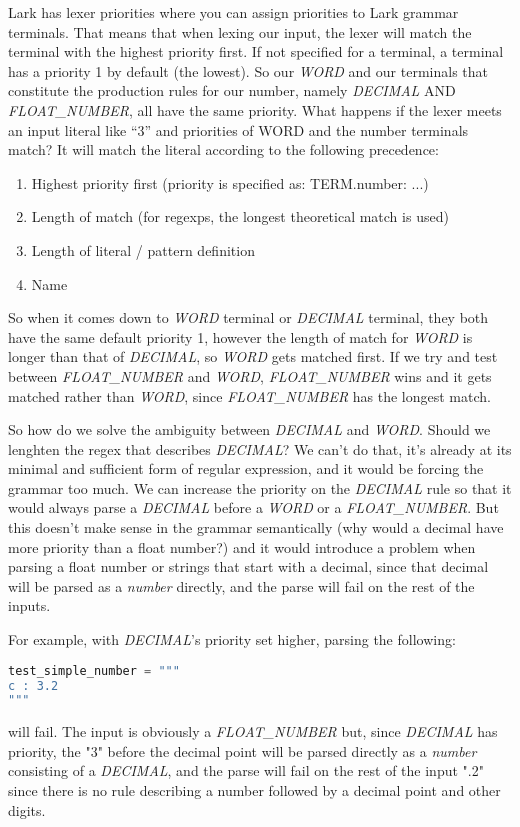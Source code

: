 \documentclass[12pt]{article}
\begin{document}
Lark has lexer priorities where you can assign priorities to Lark grammar terminals. That means that when lexing our input, the lexer will match the terminal with the highest priority first. If not specified for a terminal, a terminal has a priority 1 by default (the lowest). So our \emph{WORD} and our terminals that constitute the production rules for our number, namely \emph{DECIMAL} AND \emph{FLOAT\_NUMBER}, all have the same priority. What happens if the lexer meets an input literal like “3” and priorities of WORD and the number terminals match? It will match the literal according to the following precedence:
\begin{enumerate}
    \item Highest priority first (priority is specified as: TERM.number: ...)
    \item Length of match (for regexps, the longest theoretical match is used)
    \item Length of literal / pattern definition
    \item Name
\end{enumerate}

So when it comes down to \emph{WORD} terminal or \emph{DECIMAL} terminal, they both have the same default priority 1, however the length of match for \emph{WORD} is longer than that of \emph{DECIMAL}, so \emph{WORD} gets matched first. If we try and test between \emph{FLOAT\_NUMBER} and \emph{WORD}, \emph{FLOAT\_NUMBER} wins and it gets matched rather than \emph{WORD}, since \emph{FLOAT\_NUMBER} has the longest match.

So how do we solve the ambiguity between \emph{DECIMAL} and \emph{WORD}. Should we lenghten the regex that describes \emph{DECIMAL}? We can't do that, it's already at its minimal and sufficient form of regular expression, and it would be forcing the grammar too much. We can increase the priority on the \emph{DECIMAL} rule so that it would always parse a \emph{DECIMAL} before a \emph{WORD} or a \emph{FLOAT\_NUMBER}. But this doesn't make sense in the grammar semantically (why would a decimal have more priority than a float number?) and it would introduce a problem when parsing a float number or strings that start with a decimal, since that decimal will be parsed as a \emph{number} directly, and the parse will fail on the rest of the inputs.

For example, with \emph{DECIMAL}'s priority set higher, parsing the following:
\begin{lstlisting}[language=Python]
test_simple_number = """
c : 3.2
"""
\end{lstlisting}
will fail. The input is obviously a \emph{FLOAT\_NUMBER} but, since \emph{DECIMAL} has priority, the "3" before the decimal point will be parsed directly as a \emph{number} consisting of a \emph{DECIMAL}, and the parse will fail on the rest of the input ".2" since there is no rule describing a number followed by a decimal point and other digits.
\end{document}
